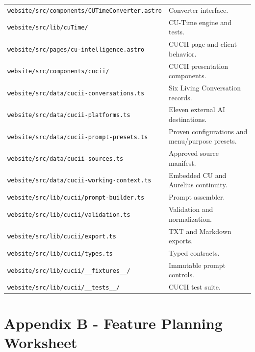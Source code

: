 \documentclass[11pt,letterpaper]{article}
\newcommand{\filepath}[1]{\nolinkurl{#1}}
\begin{document}
\begin{longtable}{L{2.75in}L{3.65in}}
\filepath{website/src/components/CUTimeConverter.astro} & Converter interface. \\
\filepath{website/src/lib/cuTime/} & CU-Time engine and tests. \\
\filepath{website/src/pages/cu-intelligence.astro} & CUCII page and client behavior. \\
\filepath{website/src/components/cucii/} & CUCII presentation components. \\
\filepath{website/src/data/cucii-conversations.ts} & Six Living Conversation records. \\
\filepath{website/src/data/cucii-platforms.ts} & Eleven external AI destinations. \\
\filepath{website/src/data/cucii-prompt-presets.ts} & Proven configurations and menu/purpose presets. \\
\filepath{website/src/data/cucii-sources.ts} & Approved source manifest. \\
\filepath{website/src/data/cucii-working-context.ts} & Embedded CU and Aurelius continuity. \\
\filepath{website/src/lib/cucii/prompt-builder.ts} & Prompt assembler. \\
\filepath{website/src/lib/cucii/validation.ts} & Validation and normalization. \\
\filepath{website/src/lib/cucii/export.ts} & TXT and Markdown exports. \\
\filepath{website/src/lib/cucii/types.ts} & Typed contracts. \\
\filepath{website/src/lib/cucii/__fixtures__/} & Immutable prompt controls. \\
\filepath{website/src/lib/cucii/__tests__/} & CUCII test suite. \\
\bottomrule
\end{longtable}

\section{Appendix B - Feature Planning Worksheet}
\end{document}
